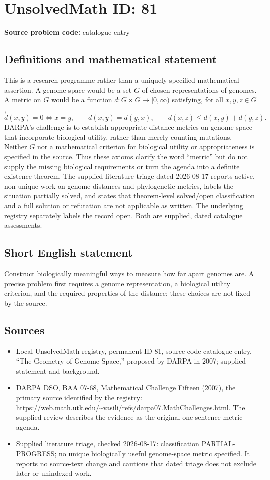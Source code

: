 \documentclass[11pt]{article}
\begin{document}
\section*{UnsolvedMath ID: 81}
\textbf{Source problem code:} catalogue entry
\subsection{Definitions and mathematical statement}
This is a research programme rather than a uniquely specified mathematical assertion. A genome space would be a set $G$ of chosen representations of genomes. A metric on $G$ would be a function $d:G\times G\to[0,\infty)$ satisfying, for all $x,y,z\in G$, \[d(x,y)=0\iff x=y,\qquad d(x,y)=d(y,x),\qquad d(x,z)\leq d(x,y)+d(y,z).\] DARPA's challenge is to establish appropriate distance metrics on genome space that incorporate biological utility, rather than merely counting mutations. Neither $G$ nor a mathematical criterion for biological utility or appropriateness is specified in the source. Thus these axioms clarify the word ``metric'' but do not supply the missing biological requirements or turn the agenda into a definite existence theorem. The supplied literature triage dated 2026-08-17 reports active, non-unique work on genome distances and phylogenetic metrics, labels the situation partially solved, and states that theorem-level solved/open classification and a full solution or refutation are not applicable as written. The underlying registry separately labels the record open. Both are supplied, dated catalogue assessments.
\subsection{Short English statement}
Construct biologically meaningful ways to measure how far apart genomes are. A precise problem first requires a genome representation, a biological utility criterion, and the required properties of the distance; these choices are not fixed by the source.
\subsection{Sources}
\begin{itemize}
\item Local UnsolvedMath registry, permanent ID 81, source code catalogue entry, ``The Geometry of Genome Space,'' proposed by DARPA in 2007; supplied statement and background.
\item DARPA DSO, BAA 07-68, Mathematical Challenge Fifteen (2007), the primary source identified by the registry: \url{https://web.math.utk.edu/~vasili/refs/darpa07.MathChallenges.html}. The supplied review describes the evidence as the original one-sentence metric agenda.
\item Supplied literature triage, checked 2026-08-17: classification PARTIAL-PROGRESS; no unique biologically useful genome-space metric specified. It reports no source-text change and cautions that dated triage does not exclude later or unindexed work.
\end{itemize}
\end{document}
